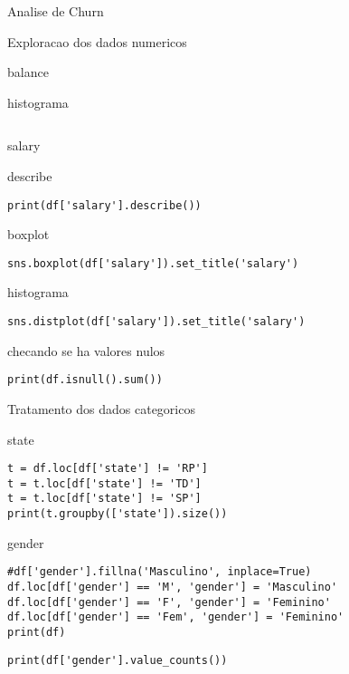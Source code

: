 \documentclass[presentation]{beamer}
\begin{document}
\begin{frame}[label={sec:org6b1fb3e},fragile]{Analise de Churn}
\begin{block}{Exploracao dos dados numericos}
\begin{block}{balance}
\begin{block}{histograma}
\begin{verbatim}
\end{verbatim}
\end{block}
\end{block}
\begin{block}{salary}
\begin{block}{describe}
\begin{verbatim}
print(df['salary'].describe())
\end{verbatim}
\end{block}
\begin{block}{boxplot}
\begin{verbatim}
sns.boxplot(df['salary']).set_title('salary')
\end{verbatim}
\end{block}
\begin{block}{histograma}
\begin{verbatim}
sns.distplot(df['salary']).set_title('salary')
\end{verbatim}
\end{block}
\end{block}
\end{block}
\begin{block}{checando se ha valores nulos}
\begin{verbatim}
print(df.isnull().sum())
\end{verbatim}
\end{block}
\begin{block}{Tratamento dos dados categoricos}
\begin{block}{state}
\begin{verbatim}
t = df.loc[df['state'] != 'RP']
t = t.loc[df['state'] != 'TD']
t = t.loc[df['state'] != 'SP']
print(t.groupby(['state']).size())
\end{verbatim}
\end{block}
\begin{block}{gender}
\begin{verbatim}
#df['gender'].fillna('Masculino', inplace=True)
df.loc[df['gender'] == 'M', 'gender'] = 'Masculino'
df.loc[df['gender'] == 'F', 'gender'] = 'Feminino'
df.loc[df['gender'] == 'Fem', 'gender'] = 'Feminino'
print(df)
\end{verbatim}

\begin{verbatim}
print(df['gender'].value_counts())


\end{verbatim}
\end{block}
\end{block}
\end{frame}
\end{document}
